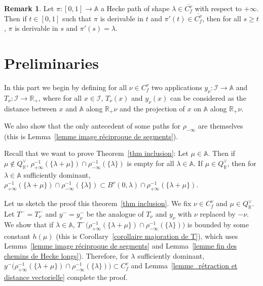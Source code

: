 \documentclass[12pt]{article}
\theoremstyle{plain}
\theoremstyle{definition}
\newtheorem{rque}[thm]{Remark}
\newcommand{\R}{\mathbb{R}}
\newcommand{\A}{\mathbb{A}}
\newcommand{\I}{\mathcal{I}}
\begin{document}
\begin{rque}\label{rque chemins de Hecke}
Let $\pi:[0,1]\rightarrow \A$ a Hecke path of shape $\lambda\in \overline{C_f^v}$ with respect to $+\infty$. Then if $t\in [0,1]$ such that $\pi$ is derivable in $t$ and $\pi'(t)\in \overline{C_f^v}$, then for all $s\geq t$, $\pi$ is derivable in $s$ and $\pi'(s)=\lambda$.
\end{rque}

\section{Preliminaries}\label{sect preliminaries}

In this part we begin by defining for all $\nu\in C_f^v$ two applications $y_\nu:\I\rightarrow \A$ and $T_\nu:\I\rightarrow \R_+$, where for all $x\in \I$, $T_\nu(x)$ and $y_\nu(x)$ can be considered as the distance between $x$ and $\A$ along $\R_+\nu$ and the projection of $x$ on $\A$ along $\R_+\nu$. 

We also show that the only antecedent of some paths for $\rho_{-\infty}$ are themselves (this is Lemma~\ref{lemme image réciproque de segments}).

\vspace{3mm}
Recall that we want to prove Theorem~\ref{thm inclusion}: Let $\mu\in \A$. Then if $\mu\notin Q_{\R}^\vee$, $\rho_{+\infty}^{-1}(\{\lambda+\mu\})\cap \rho_{-\infty}^{-1}(\{\lambda\})$ is empty for all $\lambda\in \A$. If $\mu\in Q^\vee_{\R}$, then for $\lambda\in \A$ sufficiently dominant, $\rho_{+\infty}^{-1}(\{\lambda+\mu\})\cap \rho_{-\infty}^{-1}(\{\lambda\})\subset B^v(0,\lambda)\cap \rho_{+\infty}^{-1}(\{\lambda+\mu\}) $.





Let us sketch the proof this theorem~\ref{thm inclusion}. We fix $\nu\in C_f^v$ and $\mu\in Q^\vee_\R$. Let $T^-=T_{\nu}^-$ and $y^-=y_\nu^-$ be the analogue of $T_\nu$ and $y_\nu$ with $\nu$ replaced by $-\nu$. We show that if $\lambda\in \A$, $T^-\big(\rho_{+\infty}^{-1}(\{\lambda+\mu\})\cap \rho_{-\infty}^{-1}(\{\lambda\})\big)$ is bounded by some constant $h(\mu)$ (this is Corollary~\ref{corollaire majoration de T}), which uses Lemma~\ref{lemme image réciproque de segments} and Lemma~\ref{lemme fin des chemins de Hecke longs}). Therefore, for $\lambda$ sufficiently dominant, $y^-\big(\rho_{+\infty}^{-1}(\{\lambda+\mu\})\cap \rho_{-\infty}^{-1}(\{\lambda\})\big)\subset C_f^v$ and Lemma~\ref{lemme_rétraction et distance vectorielle} complete the proof.
\end{document}
